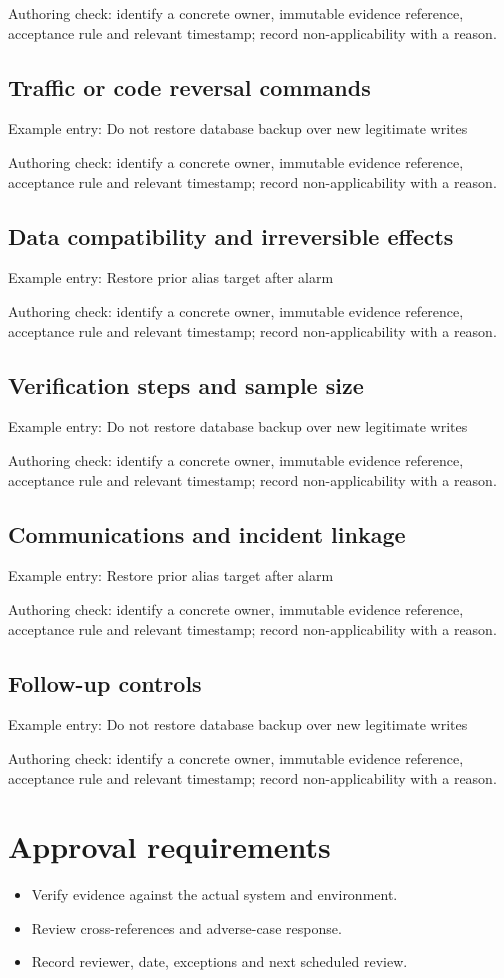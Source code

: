 \documentclass[10pt,letterpaper]{article}
\begin{document}
Authoring check: identify a concrete owner, immutable evidence reference, acceptance rule and relevant timestamp; record non-applicability with a reason.


\subsection{Traffic or code reversal commands}
Example entry: Do not restore database backup over new legitimate writes

Authoring check: identify a concrete owner, immutable evidence reference, acceptance rule and relevant timestamp; record non-applicability with a reason.


\subsection{Data compatibility and irreversible effects}
Example entry: Restore prior alias target after alarm

Authoring check: identify a concrete owner, immutable evidence reference, acceptance rule and relevant timestamp; record non-applicability with a reason.


\subsection{Verification steps and sample size}
Example entry: Do not restore database backup over new legitimate writes

Authoring check: identify a concrete owner, immutable evidence reference, acceptance rule and relevant timestamp; record non-applicability with a reason.


\subsection{Communications and incident linkage}
Example entry: Restore prior alias target after alarm

Authoring check: identify a concrete owner, immutable evidence reference, acceptance rule and relevant timestamp; record non-applicability with a reason.


\subsection{Follow-up controls}
Example entry: Do not restore database backup over new legitimate writes

Authoring check: identify a concrete owner, immutable evidence reference, acceptance rule and relevant timestamp; record non-applicability with a reason.


\section{Approval requirements}
\begin{itemize}
\item Verify evidence against the actual system and environment.
\item Review cross-references and adverse-case response.
\item Record reviewer, date, exceptions and next scheduled review.
\end{itemize}
\end{document}
